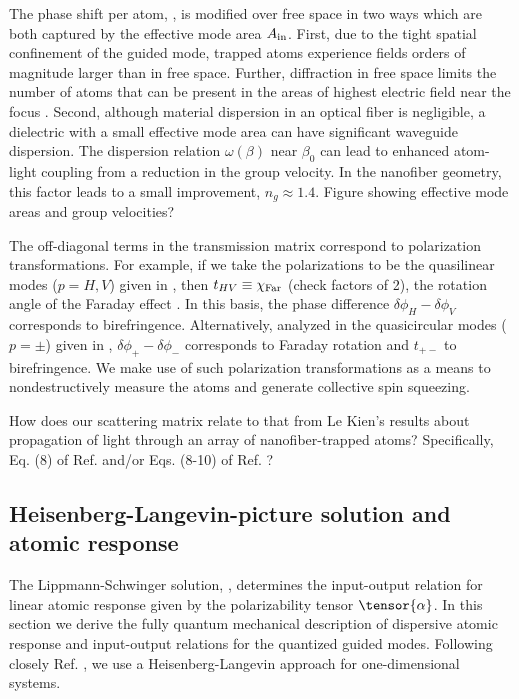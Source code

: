 \documentclass[preprint,aps,pra,onecolumn]{revtex4-1} %
\newcommand{\comment}[1]{{\color{Maroon} #1}}
\begin{document}
The phase shift per atom, , is modified over free space in two ways which are both captured by the effective mode area $A_{\rm in}$.  First, due to the tight spatial confinement of the guided mode, trapped atoms experience fields orders of magnitude larger than in free space.  Further, diffraction in free space limits the number of atoms that can be present in the areas of highest electric field near the focus \cite{baragiola_three-dimensional_2014}.  Second, although material dispersion in an optical fiber is negligible, a dielectric with a small effective mode area can have significant waveguide dispersion. The dispersion relation $\omega(\beta)$ near $\beta_0$ can lead to enhanced atom-light coupling from a reduction in the group velocity. In the nanofiber geometry, this factor leads to a small improvement, \comment{ $n_g \approx 1.4$. Figure showing effective mode areas and group velocities?}
 
The off-diagonal terms in the transmission matrix correspond to polarization transformations.  For example, if we take the polarizations to be the quasilinear modes ($p = H,V$) given in , then $t_{HV} \equiv \chi_{\rm Far}$ \comment{(check factors of 2)}, the rotation angle of the Faraday effect \cite{}.  In this basis, the phase difference $\delta  \phi_H - \delta \phi_V$ corresponds to birefringence.  Alternatively, analyzed in the quasicircular modes ($p=\pm$) given in , $\delta \phi_+ -\delta  \phi_-$ corresponds to Faraday rotation and $t_{+-}$ to birefringence.  We make use of such polarization transformations as a means to nondestructively measure the atoms and generate collective spin squeezing.

\comment{How does our scattering matrix relate to that from Le Kien's results about propagation of light through an array of nanofiber-trapped atoms?  Specifically, Eq. (8) of Ref. \cite{le_kien_correlations_2008} and/or Eqs. (8-10) of Ref. \cite{le_kien_propagation_2014}?  
}
	
	\subsection{Heisenberg-Langevin-picture solution and atomic response}
	
The Lippmann-Schwinger solution, , determines the input-output relation for linear atomic response given by the polarizability tensor $\tensor{\alpha}$.  In this section we derive the fully quantum mechanical description of dispersive atomic response and input-output relations for the quantized guided modes.  Following closely Ref. \cite{le_kien_spontaneous_2005}, we use a Heisenberg-Langevin approach for one-dimensional systems.  
\end{document}
